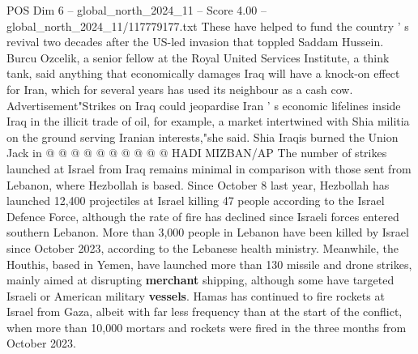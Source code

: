 \begin{textsample}{POS Dim 6 – global\_north\_2024\_11 – Score 4.00 – global\_north\_2024\_11/117779177.txt}
These have helped to fund the country ' s revival two decades after the US-led invasion that toppled Saddam Hussein.
Burcu Ozcelik, a senior fellow at the Royal United Services Institute, a think tank, said anything that economically damages Iraq will have a knock-on effect for Iran, which for several years has used its neighbour as a cash cow.
Advertisement"Strikes on Iraq could jeopardise Iran ' s economic lifelines inside Iraq in the illicit trade of oil, for example, a market intertwined with Shia militia on the ground serving Iranian interests,"she said.
Shia Iraqis burned the Union Jack in @ @ @ @ @ @ @ @ @ @ HADI MIZBAN/AP The number of strikes launched at Israel from Iraq remains minimal in comparison with those sent from Lebanon, where Hezbollah is based.
Since October 8 last year, Hezbollah has launched 12,400 projectiles at Israel killing 47 people according to the Israel Defence Force, although the rate of fire has declined since Israeli forces entered southern Lebanon.
More than 3,000 people in Lebanon have been killed by Israel since October 2023, according to the Lebanese health ministry.
Meanwhile, the Houthis, based in Yemen, have launched more than 130 missile and drone strikes, mainly aimed at disrupting \textbf{merchant} shipping, although some have targeted Israeli or American military \textbf{vessels}.
Hamas has continued to fire rockets at Israel from Gaza, albeit with far less frequency than at the start of the conflict, when more than 10,000 mortars and rockets were fired in the three months from October 2023.

\end{textsample}
